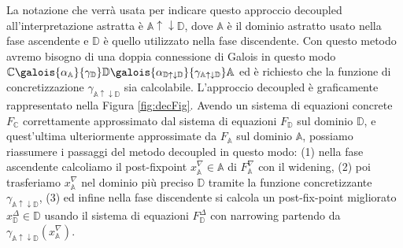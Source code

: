 La notazione che verrà usata per indicare questo approccio decoupled all'interpretazione astratta è \(\mathbb{A}\uparrow\downarrow\mathbb{D}\), dove \(\mathbb{A}\) è il dominio astratto usato nella fase ascendente e \(\mathbb{D}\) è quello utilizzato nella fase discendente. Con questo metodo avremo bisogno di una doppia connessione di Galois in questo modo \(\mathbb{C}\galois{\alpha_{\mathbb{A}}}{\gamma_{\mathbb{D}}}\mathbb{D}\galois{\alpha_{\mathbb{D}\uparrow\downarrow\mathbb{D}}}{\gamma_{\mathbb{A}\uparrow\downarrow\mathbb{D}}}\mathbb{A}\) ed è richiesto che la funzione di concretizzazione \(\gamma_{\mathbb{A}\uparrow\downarrow\mathbb{D}}\) sia calcolabile. L'approccio decoupled è graficamente rappresentato nella Figura \ref{fig:decFig}. Avendo un sistema di equazioni concrete \(F_{\mathbb{C}}\) correttamente approssimato dal sistema di equazioni \(F_{\mathbb{D}}\) sul dominio \(\mathbb{D}\), e quest'ultima ulteriormente approssimate da \(F_{\mathbb{A}}\) sul dominio \(\mathbb{A}\), possiamo riassumere i passaggi del metodo decoupled in questo modo: (1) nella fase ascendente calcoliamo il post-fixpoint \(x^{\nabla}_{\mathbb{A}}\in\mathbb{A}\) di \(F^{\nabla}_{\mathbb{A}}\) con il widening, (2) poi trasferiamo \(x^{\nabla}_{\mathbb{A}}\) nel dominio più preciso \(\mathbb{D}\) tramite la funzione concretizzante \(\gamma_{\mathbb{A}\uparrow\downarrow\mathbb{D}}\), (3) ed infine nella fase discendente si calcola un post-fix-point migliorato \(x^{\Delta}_{\mathbb{D}}\in\mathbb{D}\) usando il sistema di equazioni \(F^{\Delta}_{\mathbb{D}}\) con narrowing partendo da  \(\gamma_{\mathbb{A}\uparrow\downarrow\mathbb{D}}(x^{\nabla}_{\mathbb{A}})\).

